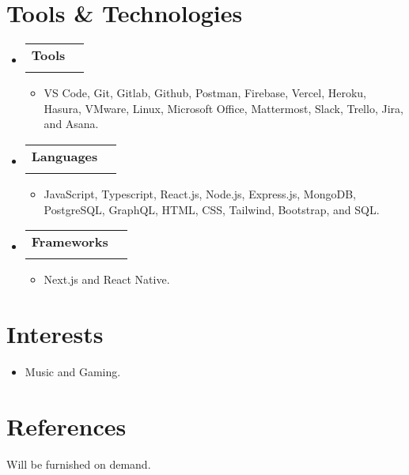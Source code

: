 \documentclass[letterpaper,11pt]{article}
\makeatletter
\newcommand{\resumeItem}[1]{
  \item\small{
    {#1 \vspace{-2pt}}
  }
}
\newcommand{\resumeSubheading}[4]{
  \vspace{-1pt}\item
    \begin{tabular*}{0.97\textwidth}[t]{l@{\extracolsep{\fill}}r}
      \textbf{#1} & #2 \\
      \textit{\small#3} & \textit{\small #4} \\
    \end{tabular*}\vspace{-6pt}
}
\newcommand{\resumeSubHeadingListStart}{\begin{itemize}[leftmargin=0.15in, label={}]}
\newcommand{\resumeSubHeadingListEnd}{\end{itemize}}
\newcommand{\resumeItemListStart}{\begin{itemize}}
\newcommand{\resumeItemListEnd}{\end{itemize}\vspace{-4pt}}
\makeatother
\begin{document}
\section{Tools \& Technologies}
  \resumeSubHeadingListStart
      \resumeSubheading
      {Tools}{}{}{}\vspace{-12pt}
      \resumeItemListStart
        \resumeItem{VS Code, Git, Gitlab, Github, Postman, Firebase, Vercel, Heroku, Hasura, VMware, Linux, Microsoft Office, Mattermost, Slack, Trello, Jira, and Asana.}
    \resumeItemListEnd
    \resumeSubheading
    {Languages}{}{}{}\vspace{-12pt}
      \resumeItemListStart
        \resumeItem{JavaScript, Typescript,  React.js, Node.js, Express.js,  MongoDB, PostgreSQL, GraphQL, HTML, CSS, Tailwind, Bootstrap, and SQL.}
    \resumeItemListEnd
    \resumeSubheading
    {Frameworks}{}{}{}\vspace{-12pt}
      \resumeItemListStart
        \resumeItem{Next.js and React Native.}
    \resumeItemListEnd
  \resumeSubHeadingListEnd


\section{Interests}
      \resumeItemListStart
        \resumeItem{Music and Gaming.}
    \resumeItemListEnd

\section{References}
    \begin{itemize}[leftmargin=0.15in, label={}]
    \small{\item{
     \textbf{}{Will be furnished on demand.} \\
    }}
 \end{itemize}
      



\end{document}
